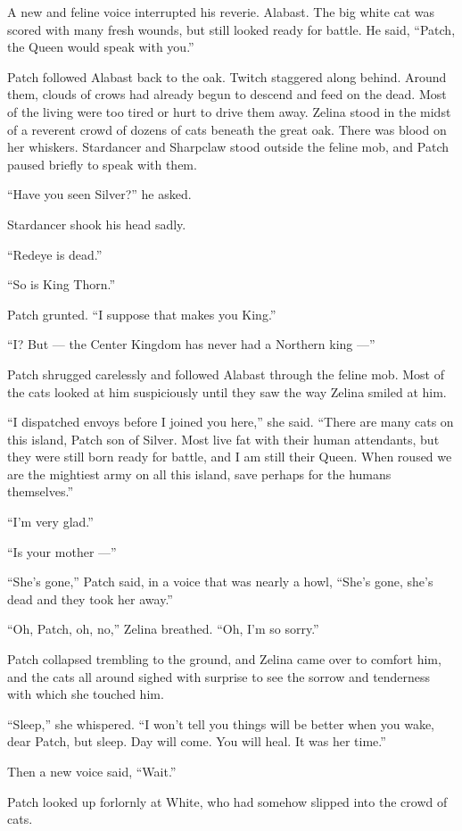 \documentclass[12pt]{memoir}
\begin{document}
A new and feline voice interrupted his reverie. Alabast. The big white
cat was scored with many fresh wounds, but still looked ready for
battle. He said, “Patch, the Queen would speak with you.”

Patch followed Alabast back to the oak. Twitch staggered along
behind. Around them, clouds of crows had already begun to descend and
feed on the dead. Most of the living were too tired or hurt to drive
them away. Zelina stood in the midst of a reverent crowd of dozens of
cats beneath the great oak. There was blood on her
whiskers. Stardancer and Sharpclaw stood outside the feline mob, and
Patch paused briefly to speak with them.

“Have you seen Silver?” he asked.

Stardancer shook his head sadly.

“Redeye is dead.”

“So is King Thorn.”

Patch grunted. “I suppose that makes you King.”

“I? But — the Center Kingdom has never had a Northern king —”

Patch shrugged carelessly and followed Alabast through the feline
mob. Most of the cats looked at him suspiciously until they saw the
way Zelina smiled at him.

“I dispatched envoys before I joined you here,” she said. “There are
many cats on this island, Patch son of Silver. Most live fat with
their human attendants, but they were still born ready for battle, and
I am still their Queen. When roused we are the mightiest army on all
this island, save perhaps for the humans themselves.”

“I’m very glad.”

“Is your mother —”

“She’s gone,” Patch said, in a voice that was nearly a howl, “She’s
gone, she’s dead and they took her away.”

“Oh, Patch, oh, no,” Zelina breathed. “Oh, I’m so sorry.”

Patch collapsed trembling to the ground, and Zelina came over to
comfort him, and the cats all around sighed with surprise to see the
sorrow and tenderness with which she touched him.

“Sleep,” she whispered. “I won’t tell you things will be better when
you wake, dear Patch, but sleep. Day will come. You will heal. It was
her time.”

Then a new voice said, “Wait.”

Patch looked up forlornly at White, who had somehow slipped into the
crowd of cats.
\end{document}
